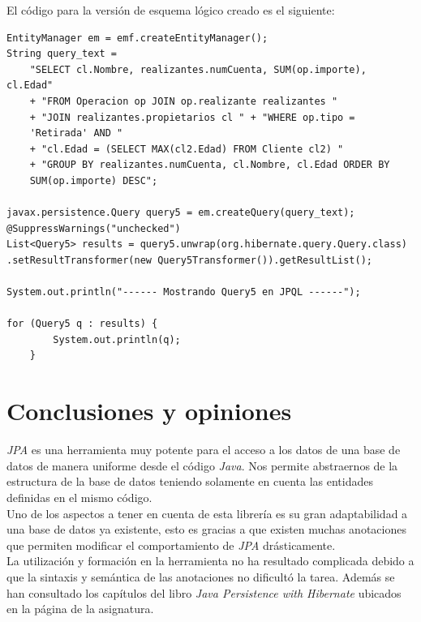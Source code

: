 \documentclass[11pt,a4paper]{article}
\begin{document}
\bigbreak
El código para la versión de esquema lógico creado es el siguiente:
\begin{lstlisting}
EntityManager em = emf.createEntityManager();
String query_text = 
  	"SELECT cl.Nombre, realizantes.numCuenta, SUM(op.importe), cl.Edad"
	+ "FROM Operacion op JOIN op.realizante realizantes "
  	+ "JOIN realizantes.propietarios cl " + "WHERE op.tipo =
  	'Retirada' AND "
	+ "cl.Edad = (SELECT MAX(cl2.Edad) FROM Cliente cl2) "
	+ "GROUP BY realizantes.numCuenta, cl.Nombre, cl.Edad ORDER BY 			
	SUM(op.importe) DESC";

javax.persistence.Query query5 = em.createQuery(query_text);
@SuppressWarnings("unchecked")
List<Query5> results = query5.unwrap(org.hibernate.query.Query.class)
.setResultTransformer(new Query5Transformer()).getResultList();

System.out.println("------ Mostrando Query5 en JPQL ------");

for (Query5 q : results) {
      	System.out.println(q);
  	}
\end{lstlisting}

\newpage
\section{Conclusiones y opiniones}

\emph{JPA} es una herramienta muy potente para el acceso a los datos de una base de datos de manera uniforme desde el código \emph{Java}. Nos permite abstraernos de la estructura de la base de datos teniendo solamente en cuenta las entidades definidas en el mismo código.\\
Uno de los aspectos a tener en cuenta de esta librería es su gran adaptabilidad a una base de datos ya existente, esto es gracias a que existen muchas anotaciones que permiten modificar el comportamiento de \emph{JPA} drásticamente.\\

La utilización y formación en la herramienta no ha resultado complicada debido a que la sintaxis y semántica de las anotaciones no dificultó la tarea. Además se han consultado los capítulos del libro \emph{Java Persistence with Hibernate} ubicados en la página de la asignatura.\\
\end{document}
